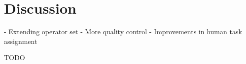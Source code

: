 \chapter{Discussion}
\label{chap:discussion}

- Extending operator set
- More quality control
- Improvements in human task assignment

TODO
